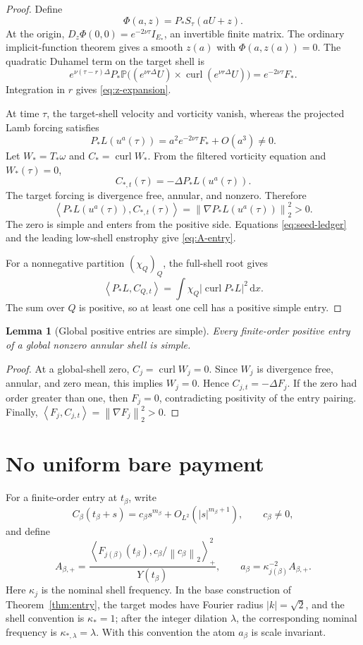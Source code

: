 \documentclass[11pt]{article}
\newtheorem{lemma}[theorem]{Lemma}
\theoremstyle{definition}
\newcommand{\Pp}{\mathbb P}
\newcommand{\curl}{\operatorname{curl}}
\newcommand{\ip}[2]{\left\langle #1,#2\right\rangle}
\newcommand{\norm}[1]{\left\lVert #1\right\rVert}
\newcommand{\abs}[1]{\left\lvert #1\right\rvert}
\newcommand{\dd}{\,\mathrm d}
\begin{document}
\begin{proof}
Define
\[
 \Phi(a,z)=P_*S_\tau(aU+z).
\]
At the origin,
\(D_z\Phi(0,0)=e^{-2\nu\tau}I_{E_*}\), an invertible finite matrix.  The
ordinary implicit-function theorem gives a smooth \(z(a)\) with
\(\Phi(a,z(a))=0\).  The quadratic Duhamel term on the target shell is
\[
 e^{\nu(\tau-r)\Delta}P_*
 \Pp\bigl((e^{\nu r\Delta}U)\times
 \curl(e^{\nu r\Delta}U)\bigr)
 =e^{-2\nu\tau}F_*.
\]
Integration in \(r\) gives \eqref{eq:z-expansion}.

At time \(\tau\), the target-shell velocity and vorticity vanish, whereas
the projected Lamb forcing satisfies
\[
 P_*L(u^a(\tau))
 =a^2e^{-2\nu\tau}F_*+O(a^3)\ne0.
\]
Let \(W_*=T_*\omega\) and \(C_*=\curl W_*\).  From the filtered vorticity
equation and \(W_*(\tau)=0\),
\[
 C_{*,t}(\tau)=-\Delta P_*L(u^a(\tau)).
\]
The target forcing is divergence free, annular, and nonzero.  Therefore
\[
 \ip{P_*L(u^a(\tau))}{C_{*,t}(\tau)}
 =\norm{\nabla P_*L(u^a(\tau))}_2^2>0.
\]
The zero is simple and enters from the positive side.  Equations
\eqref{eq:seed-ledger} and the leading low-shell enstrophy give
\eqref{eq:A-entry}.

For a nonnegative partition \((\chi_Q)_Q\), the full-shell root gives
\[
 \ip{P_*L}{C_{Q,t}}
 =\int\chi_Q\abs{\curl P_*L}^2\dd x.
\]
The sum over \(Q\) is positive, so at least one cell has a positive simple
entry.
\end{proof}

\begin{lemma}[Global positive entries are simple]\label{lem:simple}
Every finite-order positive entry of a global nonzero annular shell is
simple.
\end{lemma}

\begin{proof}
At a global-shell zero, \(C_j=\curl W_j=0\).  Since \(W_j\) is divergence
free, annular, and zero mean, this implies \(W_j=0\).  Hence
\(C_{j,t}=-\Delta F_j\).  If the zero had order greater than one, then
\(F_j=0\), contradicting positivity of the entry pairing.  Finally,
\(\ip{F_j}{C_{j,t}}=\norm{\nabla F_j}_2^2>0\).
\end{proof}

\section{No uniform bare payment}\label{sec:no-payment}

For a finite-order entry at \(t_\beta\), write
\[
 C_\beta(t_\beta+s)=c_\beta s^{m_\beta}+O_{L^2}(\abs{s}^{m_\beta+1}),
 \qquad c_\beta\ne0,
\]
and define
\begin{equation}\label{eq:entry-atom}
 A_{\beta,+}
 =\frac{\ip{F_{j(\beta)}(t_\beta)}
 {c_\beta/\norm{c_\beta}_2}_+^2}{Y(t_\beta)},
 \qquad
 a_\beta=\kappa_{j(\beta)}^{-2}A_{\beta,+}.
\end{equation}
Here \(\kappa_j\) is the nominal shell frequency.  In the base construction
of Theorem~\ref{thm:entry}, the target modes have Fourier radius
\(\abs{k}=\sqrt2\), and the shell convention is \(\kappa_*=1\); after the
integer dilation \(\lambda\), the corresponding nominal frequency is
\(\kappa_{*,\lambda}=\lambda\).  With this convention the atom
\(a_\beta\) is scale invariant.
\end{document}
